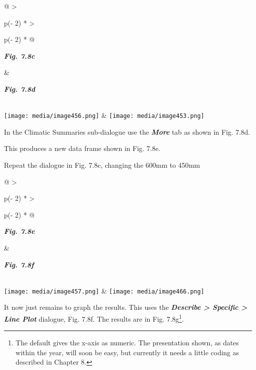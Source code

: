 \documentclass[
  letterpaper,
  DIV=11,
  numbers=noendperiod]{scrreprt}
\begin{document}
\begin{longtable}[]{@{}
  >{\raggedright\arraybackslash}p{(\columnwidth - 2\tabcolsep) * }
  >{\raggedright\arraybackslash}p{(\columnwidth - 2\tabcolsep) * }@{}}
\toprule\noalign{}
\begin{minipage}[b]{\linewidth}\raggedright
\textbf{\emph{Fig. 7.8c}}
\end{minipage} & \begin{minipage}[b]{\linewidth}\raggedright
\textbf{\emph{Fig. 7.8d}}
\end{minipage} \\
\midrule\noalign{}
\endhead
\bottomrule\noalign{}
\endlastfoot
\texttt{[image: media/image456.png]} &
\texttt{[image: media/image453.png]} \\
\end{longtable}

In the Climatic Summaries sub-dialogue use the \textbf{\emph{More}} tab
as shown in Fig. 7.8d.

This produces a new data frame shown in Fig. 7.8e.

Repeat the dialogue in Fig. 7.8c, changing the 600mm to 450mm

\begin{longtable}[]{@{}
  >{\raggedright\arraybackslash}p{(\columnwidth - 2\tabcolsep) * }
  >{\raggedright\arraybackslash}p{(\columnwidth - 2\tabcolsep) * }@{}}
\toprule\noalign{}
\begin{minipage}[b]{\linewidth}\raggedright
\textbf{\emph{Fig. 7.8e}}
\end{minipage} & \begin{minipage}[b]{\linewidth}\raggedright
\textbf{\emph{Fig. 7.8f}}
\end{minipage} \\
\midrule\noalign{}
\endhead
\bottomrule\noalign{}
\endlastfoot
\texttt{[image: media/image457.png]} &
\texttt{[image: media/image466.png]} \\
\end{longtable}

It now just remains to graph the results. This uses the
\textbf{\emph{Describe \textgreater{} Specific \textgreater{} Line
Plot}} dialogue, Fig. 7.8f. The results are in Fig. 7.8g\footnote{The
  default gives the x-axis as numeric. The presentation shown, as dates
  within the year, will soon be easy, but currently it needs a little
  coding as described in Chapter 8.}.
\end{document}
